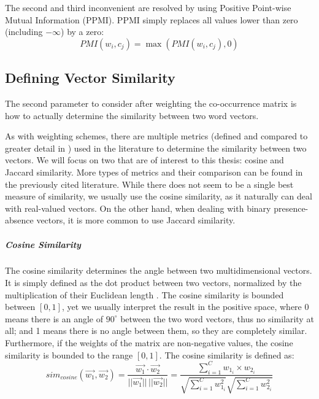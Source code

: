The second and third inconvenient are resolved by using Positive Point-wise Mutual Information (PPMI). PPMI simply replaces all values lower than zero (including $-\infty$) by a zero:
\begin{equation} \label{eq:ppmi}
PMI(w_i,c_j) = \max(PMI(w_i,c_j), 0)
\end{equation}
\subsection{Defining Vector Similarity}
The second parameter to consider after weighting the co-occurrence matrix is how to actually determine the similarity between two word vectors.

As with weighting schemes, there are multiple metrics (defined and compared to greater detail in \cite{ClarkBook2010,ferret2010testing,kiela2014systematic,clark2015vector}) used in the literature to determine the similarity between two vectors. We will focus on two that are of interest to this thesis: cosine and Jaccard similarity. More types of metrics and their comparison can be found in the previously cited literature. While there does not seem to be a single best measure of similarity, we usually use the cosine similarity, as it naturally can deal with real-valued vectors. On the other hand, when dealing with binary presence-absence vectors, it is more common to use Jaccard similarity. 

\subparagraph{Cosine Similarity}
The cosine similarity determines the angle between two multidimensional vectors. It is simply defined as the dot product between two vectors, normalized by the multiplication of their Euclidean length \cite{Manning2008}. The cosine similarity is bounded between $[0,1]$, yet we usually interpret the result in the positive space, where 0 means there is an angle of $90^\circ$ between the two word vectors, thus  no similarity at all; and 1 means there is no angle between them, so they are completely similar. Furthermore, if the weights of the matrix are non-negative values, the cosine similarity is bounded to the range $[0,1]$. The cosine similarity is defined as:
\begin{equation}
sim_{cosine}(\overrightarrow{w_1},\overrightarrow{w_2})  =  \dfrac{\overrightarrow{w_1}  \cdot \overrightarrow{w_2}}{||\overrightarrow{w_1}||\,||\overrightarrow{w_2}||} = \dfrac{\sum_{i=1}^Cw_{1_i}\times w_{2_i} }{\sqrt{\sum^C_{i=1}w_{1_i}^2}\sqrt{\sum^C_{i=1}w_{2_i}^2}}
\end{equation}

